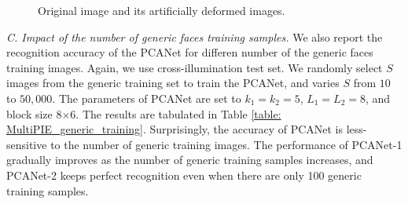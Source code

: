 \documentclass[10pt,journal,compsoc]{IEEEtran}
\begin{document}
\begin{figure}[t]
\centering
{}
\caption{Original image and its artificially deformed images.}\label{fig: artificial}
\end{figure}



\begin{figure*}[t]
\centering
{}
\quad \quad \quad \quad
{}\hspace{0cm}
\hspace{0cm}

\caption{Recognition rate of PCANet on MultiPIE cross-illumination test set, for different PCANet block size and deformation to the test image. Two block sizes [8 6] and [12 9] for histogram aggregation are tested. (a) Simultaneous translation in $x$ and $y$ directions. (b) Translation in $x$ direction. (c) Translation in $y$ direction. (d) In-plane rotation. (e) Scale variation. }\label{fig: MultiPIE_misalignment}
\end{figure*}

\vspace{0.3\baselineskip}
{\em C. Impact of the number of generic faces training samples.} We also report the recognition accuracy of the PCANet for differen number of the generic faces training images. Again, we use cross-illumination test set. We randomly select $S$ images from the generic training set to train the PCANet, and varies $S$ from $10$ to $50,000$. The parameters of PCANet are set to $k_1 = k_2 = 5$, $L_1 = L_2 = 8$, and block size 8$\times$6. The results are tabulated in Table \ref{table: MultiPIE_generic_training}. Surprisingly, the accuracy of PCANet is less-sensitive to the number of generic training images. The performance of PCANet-1 gradually improves as the number of generic training samples increases, and PCANet-2 keeps perfect recognition even when there are only 100 generic training samples.
\end{document}
